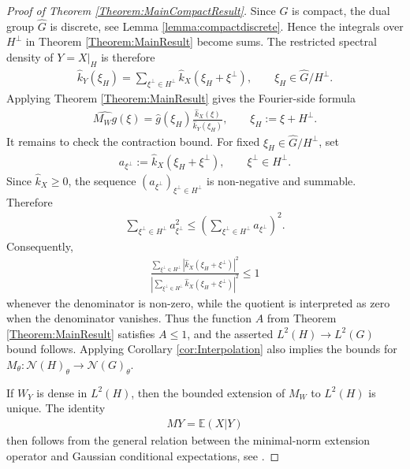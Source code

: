 \documentclass{article}
\newcommand{\E}{\mathbb{E}}
\begin{document}
\begin{appendices}
\begin{proof}[Proof of Theorem \ref{Theorem:MainCompactResult}]
    Since $G$ is compact, the dual group $\hat G$ is discrete, see Lemma \ref{lemma:compactdiscrete}. Hence the integrals over $H^\perp$ in Theorem \ref{Theorem:MainResult} become sums. The restricted spectral density of $Y=X|_H$ is therefore 
    \begin{align*}
        \hat{k}_{Y}(\xi_H)= \sum_{\xi^\perp \in H^\perp} \hat{k}_X(\xi_H+\xi^\perp), \qquad \xi_H \in \hat{G}/H^\perp.
    \end{align*} 
    Applying Theorem \ref{Theorem:MainResult} gives the Fourier-side formula 
    \begin{align*}
        \widehat{M_Wg} (\xi) = \hat{g}(\xi_H) \frac{\hat{k}_X(\xi)}{\hat{k}_Y(\xi_H)}, \qquad\xi_H:=\xi+H^\perp.
    \end{align*}
It remains to check the contraction bound. For fixed $\xi_H \in \hat{G}/H^\perp$, set
\begin{align*}
    a_{\xi^\perp} := \hat{k}_X(\xi_H+\xi^\perp), \qquad \xi^\perp \in H^\perp.
\end{align*}
Since $\hat{k}_X \geq 0$, the sequence $(a_{\xi^\perp})_{\xi^\perp \in H^\perp}$ is non-negative and summable. Therefore 
\begin{align*}
    \sum_{\xi^\perp \in H^\perp} a_{\xi^\perp}^2 \leq \left( \sum_{\xi^\perp \in H^\perp} a_{\xi^\perp} \right)^2. 
\end{align*}
Consequently, 
\begin{align*}
    \frac{
\sum_{\xi^\perp\in H^\perp}
|\hat k_X(\xi_H+\xi^\perp)|^2
}{
\left|
\sum_{\xi^\perp\in H^\perp}
\hat k_X(\xi_H+\xi^\perp)
\right|^2
}
\leq 1
\end{align*}
whenever the denominator is non-zero, while the quotient is interpreted as zero when the denominator vanishes. Thus the function $A$ from Theorem \ref{Theorem:MainResult} satisfies $A\leq 1$, and the asserted $L^2(H)\to L^2(G)$ bound follows. Applying Corollary \ref{cor:Interpolation} also implies the bounds for $M_\theta:\mathcal{N}(H)_\theta \to \mathcal{N}(G)_\theta$. 

If $W_Y$ is dense in $L^2(H)$, then the bounded extension of $M_W$ to $L^2(H)$ is unique. The identity 
\begin{align*}
    MY=\E(X \vert Y)
\end{align*}
then follows from the general relation between the minimal-norm extension operator and Gaussian conditional expectations, see \cite[Example 42]{WinkleAnalysis}. 
\end{proof}


\end{appendices}
\end{document}
